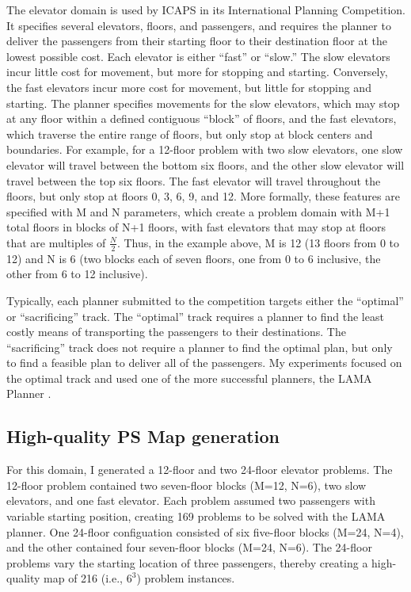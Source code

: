 The elevator domain is used by ICAPS in its International Planning Competition.  It specifies several elevators, floors, and passengers, and requires the planner to deliver the passengers from their starting floor to their destination floor at the lowest possible cost.  Each elevator is either ``fast'' or ``slow.''  The slow elevators incur little cost for movement, but more for stopping and starting.  Conversely, the fast elevators incur more cost for movement, but little for stopping and starting.  The planner specifies movements for the slow elevators, which may stop at any floor within a defined contiguous ``block'' of floors, and the fast elevators, which traverse the entire range of  floors, but only stop at block centers and boundaries.  For example, for a 12-floor problem with two slow elevators, one slow elevator will travel between the bottom six floors, and the other slow elevator will travel between the top six floors.  The fast elevator will travel throughout the floors, but only stop at floors 0, 3, 6, 9, and 12.  More formally, these features are specified with  M and N parameters, which create a problem domain with  M+1 total floors in blocks of N+1 floors, with fast elevators that may stop at floors that are multiples of $\frac{N}{2}$.  Thus, in the example above, M is 12 (13 floors from 0 to 12) and N is 6 (two blocks each of seven floors, one from 0 to 6 inclusive, the other from 6 to 12 inclusive).  

Typically, each planner submitted to the competition targets either the ``optimal'' or ``sacrificing'' track. The ``optimal'' track requires a planner to find the least costly means of transporting the passengers to their destinations.  The ``sacrificing'' track does not require a planner to find the optimal plan, but only to find a feasible plan to deliver all of the passengers.  My experiments focused on the optimal track and used one of the more successful planners, the LAMA Planner \citep{richter2010lama}.

\subsection{High-quality PS Map generation}  For this domain, I generated a 12-floor and two 24-floor elevator problems.  The 12-floor problem contained two seven-floor blocks (M=12, N=6), two slow elevators, and one fast elevator.  Each problem assumed two passengers with variable starting position, creating 169 problems to be solved with the LAMA planner.  One 24-floor configuation consisted of six five-floor blocks (M=24, N=4), and the other contained four seven-floor blocks (M=24, N=6).  The 24-floor problems vary the starting location of three passengers, thereby creating a high-quality map of 216 (i.e., $6^3$) problem instances.



